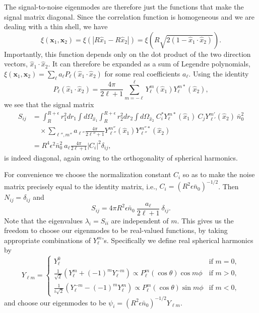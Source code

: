 \documentclass{article}
\renewcommand{\vec}[1]{\bm{#1}}
\newcommand{\nbar}{\bar{n}}
\begin{document}
The signal-to-noise eigenmodes are therefore just the functions that make the
signal matrix diagonal.  Since the correlation function is homogeneous and we
are dealing with a thin shell, we have
\begin{equation}
    \xi(\vec{x}_1,\vec{x}_2) = \xi(|R\hat{x}_1-R\hat{x}_2|) = \xi\left(R\sqrt{2(1-\hat{x}_1\cdot\hat{x}_2)}\right).
\end{equation}
Importantly, this function depends only on the dot product of the two direction
vectors, $\hat{x}_1\cdot\hat{x}_2$.  It can therefore be expanded as a sum of
Legendre polynomials,
$\xi(\vec{x}_1,\vec{x}_2) = \sum_\ell a_\ell P_\ell(\hat{x}_1\cdot\hat{x}_2)$
for some real coefficients $a_\ell$.  Using the identity
\begin{equation}
    P_\ell(\hat{x}_1\cdot\hat{x}_2) = \frac{4\pi}{2\ell+1} \sum_{m=-\ell}^\ell Y_\ell^m(\hat{x}_1) Y_\ell^{m*}(\hat{x}_2),
\end{equation}
we see that the signal matrix
\begin{align}
    S_{ij} &= \int_R^{R+\epsilon} r_1^2 dr_1 \int d\Omega_{\hat{x}_1} \int_R^{R+\epsilon} r_2^2 dr_2 \int d\Omega_{\hat{x}_2} ~ C_i^* Y_\ell^{m*}(\hat{x}_1) ~ C_j Y_{\ell'}^{m'}(\hat{x}_2) ~ \nbar_0^2 \\
           &\quad \times \sum_{\ell'',m''} a_{\ell''} \frac{4\pi}{2\ell''+1} Y_{\ell''}^{m''}(\hat{x}_1) Y_{\ell''}^{m''*}(\hat{x}_2) \\
           &= R^4 \epsilon^2 \nbar_0^2 ~ a_\ell \frac{4\pi}{2\ell+1} |C_i|^2 \delta_{ij},
\end{align}
is indeed diagonal, again owing to the orthogonality of spherical harmonics.

For convenience we choose the normalization constant $C_i$ so as to make the
noise matrix precisely equal to the identity matrix, i.e.,
$C_i = (R^2 \epsilon \nbar_0)^{-1/2}$.  Then $N_{ij} = \delta_{ij}$ and
\begin{equation}
    S_{ij} = 4\pi R^2 \epsilon \nbar_0 ~ \frac{a_\ell}{2\ell+1} ~ \delta_{ij}.
\end{equation}
Note that the eigenvalues $\lambda_i = S_{ii}$ are independent of $m$.  This
gives us the freedom to choose our eigenmodes to be real-valued functions, by
taking appropriate combinations of $Y_\ell^m$'s.  Specifically we define real
spherical harmonics by
\begin{equation}
    Y_{\ell m} =
    \begin{cases}
        Y_\ell^0 & \text{if } m = 0, \\
        \frac{1}{\sqrt{2}} (Y_\ell^m + (-1)^m Y_\ell^{-m}) \propto P_\ell^m(\cos\theta) \cos m\phi & \text{if } m > 0, \\
        \frac{1}{i\sqrt{2}} (Y_\ell^{-m} - (-1)^m Y_\ell^m) \propto P_\ell^m(\cos\theta) \sin m\phi & \text{if } m < 0,
    \end{cases}
\end{equation}
and choose our eigenmodes to be $\psi_i = (R^2\epsilon \nbar_0)^{-1/2} Y_{\ell m}$.
\end{document}
